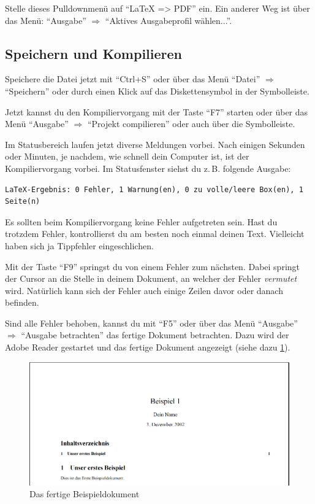 Stelle dieses Pulldownmenü auf \enquote{LaTeX => PDF} ein. Ein anderer Weg ist über das Menü: \enquote{Ausgabe} $\Rightarrow$ \enquote{Aktives Ausgabeprofil wählen...}.

\subsection{Speichern und Kompilieren}

Speichere die Datei jetzt mit \enquote{Ctrl+S} oder über das Menü \enquote{Datei} $\Rightarrow$ \enquote{Speichern} oder durch einen Klick auf das Diskettensymbol in der Symbolleiste.

Jetzt kannst du den Kompiliervorgang mit der Taste \enquote{F7} starten oder über das Menü \enquote{Ausgabe} $\Rightarrow$ \enquote{Projekt compilieren} oder auch über die Symbolleiste.

Im Statusbereich laufen jetzt diverse Meldungen vorbei. Nach einigen Sekunden oder Minuten, je nachdem, wie schnell dein Computer ist, ist der Kompiliervorgang vorbei. Im Statusfenster siehst du z.\,B. folgende Ausgabe:
\begin{lstlisting}
LaTeX-Ergebnis: 0 Fehler, 1 Warnung(en), 0 zu volle/leere Box(en), 1 Seite(n)
\end{lstlisting}

Es sollten beim Kompiliervorgang keine Fehler aufgetreten sein. Hast du trotzdem Fehler, kontrollierst du am besten noch einmal deinen Text. Vielleicht haben sich ja Tippfehler eingeschlichen.

Mit der Taste \enquote{F9} springst du von einem Fehler zum nächsten. Dabei springt der Cursor an die Stelle in deinem Dokument, an welcher der Fehler \emph{vermutet} wird. Natürlich kann sich der Fehler auch einige Zeilen davor oder danach befinden.

Sind alle Fehler behoben, kannst du mit \enquote{F5} oder über das Menü \enquote{Ausgabe} $\Rightarrow$ \enquote{Ausgabe betrachten} das fertige Dokument betrachten. Dazu wird der Adobe Reader gestartet und das fertige Dokument angezeigt (siehe dazu \cref{fig:beispiel1_04}).

\begin{figure}[ht]
	\begin{center}
		\includegraphics[width=\linewidth]{images/beispiel1_04.png}
	\end{center}
	\caption{Das fertige Beispieldokument}
	\label{fig:beispiel1_04}
\end{figure}


